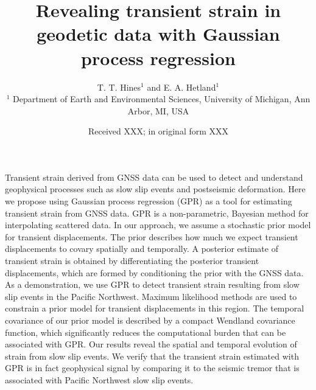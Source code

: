 \documentclass[extra,mreferee]{gji}
\title[Transient strain in geodetic data]
      {Revealing transient strain in geodetic data with Gaussian process regression}
\author[T. T. Hines and E. A. Hetland]
       {T. T. Hines$^1$ and E. A. Hetland$^1$ \\
        $^1$ Department of Earth and Environmental Sciences, University of Michigan, Ann Arbor, MI, USA}
\date{Received XXX; in original form XXX}
\begin{document}
\label{firstpage}

\maketitle

\newcommand{\pos}{\vec{x}} %
\newcommand{\data}{\mitbf{d}} %
\newcommand{\post}{\hat{u}} %
\newcommand{\points}{\mitbf{P}} %
\newcommand{\strain}{\dot\varepsilon} %
\newcommand{\E}[1]{\mathrm{E}\left[ #1 \right]} %
\newcommand{\Cov}[1]{\mathrm{Cov}\left[ #1 \right]} %
\newcommand{\e}{\mathrm{e}} %
\newcommand{\n}{\mathrm{n}} %
\newcommand{\G}{\mitbf{G}} %
\newcommand{\zeros}{\mitbf{0}} %
\newcommand{\eye}{\mitbf{I}} %

\begin{summary}


Transient strain derived from GNSS data can be used to detect and
understand geophysical processes such as slow slip events and
postseismic deformation. Here we propose using Gaussian process
regression (GPR) as a tool for estimating transient strain from GNSS
data. GPR is a non-parametric, Bayesian method for interpolating
scattered data. In our approach, we assume a stochastic prior model
for transient displacements. The prior describes how much we expect
transient displacements to covary spatially and temporally. A
posterior estimate of transient strain is obtained by differentiating
the posterior transient displacements, which are formed by
conditioning the prior with the GNSS data. As a demonstration, we use
GPR to detect transient strain resulting from slow slip events in the
Pacific Northwest. Maximum likelihood methods are used to constrain a
prior model for transient displacements in this region. The temporal
covariance of our prior model is described by a compact Wendland
covariance function, which significantly reduces the computational
burden that can be associated with GPR. Our results reveal the spatial
and temporal evolution of strain from slow slip events. We verify that
the transient strain estimated with GPR is in fact geophysical signal
by comparing it to the seismic tremor that is associated with Pacific
Northwest slow slip events.

\end{summary}
\end{document}
